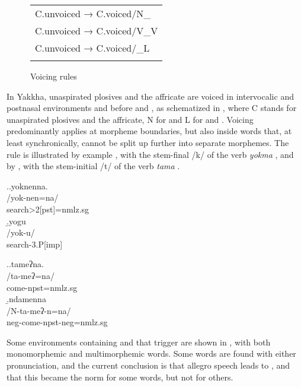 \begin{figure}[t]
\begin{center}		
\begin{tabular}{l}
\lsptoprule
C.{\sc unvoiced} → C.{\sc voiced}/N\_\\
C.{\sc unvoiced} → C.{\sc voiced}/V\_V\\ 
C.{\sc unvoiced} → C.{\sc voiced}/\_L\\
\lspbottomrule
\end{tabular}
\caption{Voicing rules}\label{voic-fig}
\end{center}
\end{figure}
In Yakkha, unaspirated plosives and the affricate are voiced in intervocalic and postnasal environments and before  and , as schematized in , where C stands for unaspirated plosives and the affricate, N for  and L for  and . Voicing predominantly  applies at morpheme boundaries, but also inside words that, at least synchronically, cannot be split up further into separate morphemes. The rule is illustrated by example \Next, with the stem-final /k/ of the verb \emph{yokma} , and by \NNext, with the stem-initial /t/ of the verb \emph{tama} . 
\largerpage


\ex.\a.\glll  yoknenna.\\
/yok-nen=na/\\
search{>2[pst]=nmlz.sg}\\
\b.\glll  yogu\\
/yok-u/\\
search{\sc -3.P[imp]}\\

\ex.\a.\glll  tameʔna.\\
/ta-meʔ=na/\\
come{\sc [3sg]-npst=nmlz.sg}\\
\b.\glll  ndamenna\\
/N-ta-meʔ-n=na/\\
{\sc neg-}come{\sc [3sg]-npst-neg=nmlz.sg}\\


Some environments containing  and  that trigger  are shown in , with both monomorphemic and multimorphemic words. Some words are found with either pronunciation, and the current conclusion is that allegro speech leads to , and that this became the norm for some words, but not for others. 




